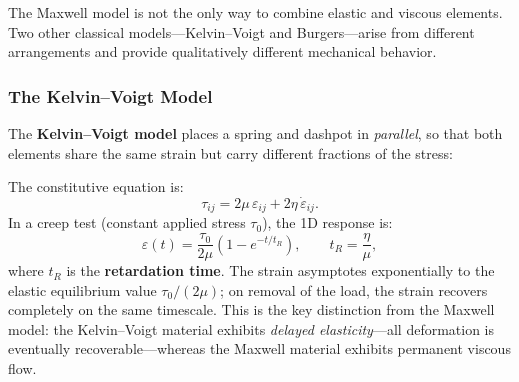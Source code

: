 \documentclass[11pt]{article}
\begin{document}
The Maxwell model is not the only way to combine elastic and viscous elements.  Two other classical models---Kelvin--Voigt and Burgers---arise from different arrangements and provide qualitatively different mechanical behavior.

\subsubsection{The Kelvin--Voigt Model}
\label{sec:kelvin_voigt}

The \textbf{Kelvin--Voigt model} places a spring and dashpot in \emph{parallel}, so that both elements share the same strain but carry different fractions of the stress:

\begin{center}
\end{center}

\noindent The constitutive equation is:
\begin{equation}
  \tau_{ij} = 2\mu\,\varepsilon_{ij} + 2\eta\,\dot{\varepsilon}_{ij}.
  \label{eq:kelvin_voigt}
\end{equation}
In a creep test (constant applied stress $\tau_0$), the 1D response is:
\begin{equation}
  \varepsilon(t) = \frac{\tau_0}{2\mu}\left(1 - e^{-t/t_R}\right), \qquad t_R = \frac{\eta}{\mu},
  \label{eq:kv_creep}
\end{equation}
where $t_R$ is the \textbf{retardation time}.  The strain asymptotes exponentially to the elastic equilibrium value $\tau_0/(2\mu)$; on removal of the load, the strain recovers completely on the same timescale.  This is the key distinction from the Maxwell model: the Kelvin--Voigt material exhibits \emph{delayed elasticity}---all deformation is eventually recoverable---whereas the Maxwell material exhibits permanent viscous flow.
\end{document}

